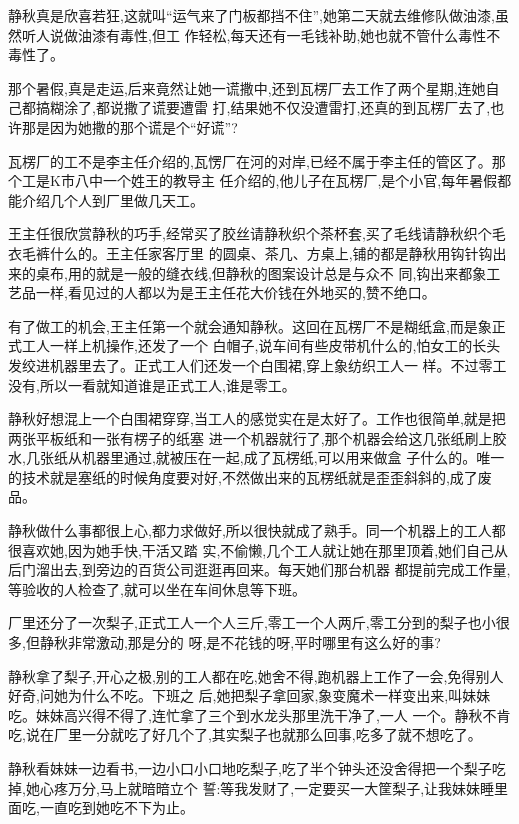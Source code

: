 ﻿\documentclass[12pt]{article}
\begin{document}
静秋真是欣喜若狂,这就叫``运气来了门板都挡不住'',她第二天就去维修队做油漆,虽然听人说做油漆有毒性,但工
作轻松,每天还有一毛钱补助,她也就不管什么毒性不毒性了。

那个暑假,真是走运,后来竟然让她一谎撒中,还到瓦楞厂去工作了两个星期,连她自己都搞糊涂了,都说撒了谎要遭雷
打,结果她不仅没遭雷打,还真的到瓦楞厂去了,也许那是因为她撒的那个谎是个``好谎''?

瓦楞厂的工不是李主任介绍的,瓦愣厂在河的对岸,已经不属于李主任的管区了。那个工是K市八中一个姓王的教导主
任介绍的,他儿子在瓦楞厂,是个小官,每年暑假都能介绍几个人到厂里做几天工。

王主任很欣赏静秋的巧手,经常买了胶丝请静秋织个茶杯套,买了毛线请静秋织个毛衣毛裤什么的。王主任家客厅里
的圆桌、茶几、方桌上,铺的都是静秋用钩针钩出来的桌布,用的就是一般的缝衣线,但静秋的图案设计总是与众不
同,钩出来都象工艺品一样,看见过的人都以为是王主任花大价钱在外地买的,赞不绝口。

有了做工的机会,王主任第一个就会通知静秋。这回在瓦楞厂不是糊纸盒,而是象正式工人一样上机操作,还发了一个
白帽子,说车间有些皮带机什么的,怕女工的长头发绞进机器里去了。正式工人们还发一个白围裙,穿上象纺织工人一
样。不过零工没有,所以一看就知道谁是正式工人,谁是零工。

静秋好想混上一个白围裙穿穿,当工人的感觉实在是太好了。工作也很简单,就是把两张平板纸和一张有楞子的纸塞
进一个机器就行了,那个机器会给这几张纸刷上胶水,几张纸从机器里通过,就被压在一起,成了瓦楞纸,可以用来做盒
子什么的。唯一的技术就是塞纸的时候角度要对好,不然做出来的瓦楞纸就是歪歪斜斜的,成了废品。

静秋做什么事都很上心,都力求做好,所以很快就成了熟手。同一个机器上的工人都很喜欢她,因为她手快,干活又踏
实,不偷懒,几个工人就让她在那里顶着,她们自己从后门溜出去,到旁边的百货公司逛逛再回来。每天她们那台机器
都提前完成工作量,等验收的人检查了,就可以坐在车间休息等下班。

厂里还分了一次梨子,正式工人一个人三斤,零工一个人两斤,零工分到的梨子也小很多,但静秋非常激动,那是分的
呀,是不花钱的呀,平时哪里有这么好的事?

静秋拿了梨子,开心之极,别的工人都在吃,她舍不得,跑机器上工作了一会,免得别人好奇,问她为什么不吃。下班之
后,她把梨子拿回家,象变魔术一样变出来,叫妹妹吃。妹妹高兴得不得了,连忙拿了三个到水龙头那里洗干净了,一人
一个。静秋不肯吃,说在厂里一分就吃了好几个了,其实梨子也就那么回事,吃多了就不想吃了。

静秋看妹妹一边看书,一边小口小口地吃梨子,吃了半个钟头还没舍得把一个梨子吃掉,她心疼万分,马上就暗暗立个
誓:等我发财了,一定要买一大筐梨子,让我妹妹睡里面吃,一直吃到她吃不下为止。
\end{document}

